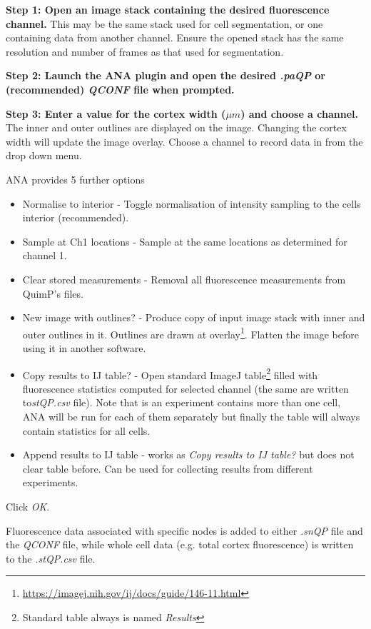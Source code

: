 \documentclass[a4paper,12pt]{article}
\begin{document}
\textbf{Step 1: Open an image stack containing the desired fluorescence channel.}  This may be the same stack used 
for cell segmentation, or one containing data from another channel.  Ensure the opened stack has the 
same resolution and number of frames as that used for segmentation.

\textbf{Step 2: Launch the ANA plugin and open the desired \textit{.paQP} or (recommended) \textit{QCONF} file when prompted.}

\textbf{Step 3: Enter a value for the cortex width ($\mu m$) and choose a channel.}  The inner and outer outlines
are displayed on the image.  Changing the cortex width will update the image overlay.
Choose a channel to record data in from the drop down menu.

ANA provides 5 further options
\begin{itemize}
	\item Normalise to interior - Toggle normalisation of intensity sampling to the cells interior (recommended).
	\item Sample at Ch1 locations - Sample at the same locations as determined for channel 1.
	\item Clear stored measurements - Removal all fluorescence measurements from QuimP's files.
	\item New image with outlines? - Produce copy of input image stack with inner and outer outlines in it. Outlines are drawn at overlay\footnote{\url{https://imagej.nih.gov/ij/docs/guide/146-11.html}}. Flatten the image before using it in another software.  
	\item Copy results to IJ table? - Open standard ImageJ table\footnote{Standard table always is named \textit{Results}} filled with fluorescence statistics computed for selected channel (the same are written to\textit{stQP.csv} file). Note that is an experiment contains more than one cell, ANA will be run for each of them separately but finally the table will always contain statistics for all cells. 
	\item Append results to IJ table - works as \textit{Copy results to IJ table?} but does not clear table before. Can be used for collecting results from different experiments. 
\end{itemize}

Click \textit{OK}.
  
Fluorescence data associated with specific nodes is added to either \textit{.snQP} 
file and the \textit{QCONF} file, while whole cell data (e.g. total cortex fluorescence) is written to the \textit{.stQP.csv} file.
\end{document}
